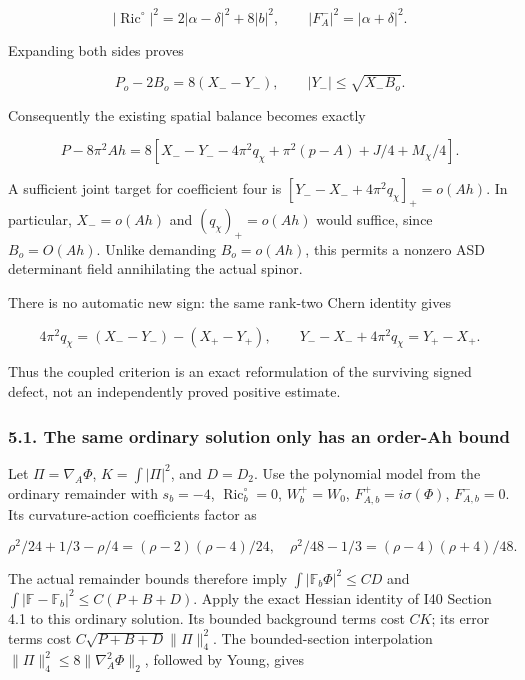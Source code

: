 \documentclass[
  11pt,
]{article}
\begin{document}
\[
 |\operatorname{Ric}^{\circ}|^2
 =2|\alpha-\delta|^2+8|b|^2,\qquad
 |F_A^-|^2=|\alpha+\delta|^2.
\]

Expanding both sides proves

\[
 \boxed{P_o-2B_o=8(X_--Y_-),\qquad
 |Y_-|\le\sqrt{X_-B_o}.}
 \tag{5.2}
\]

Consequently the existing spatial balance becomes exactly

\[
 P-8\pi^2Ah=8\left[X_--Y_--4\pi^2q_\chi+
             \pi^2(p-A)+J/4+M_\chi/4\right].
 \tag{5.3}
\]

A sufficient joint target for coefficient four is
\([Y_--X_-+4\pi^2q_\chi]_+=o(Ah)\). In particular, \(X_-=o(Ah)\) and
\((q_\chi)_+=o(Ah)\) would suffice, since \(B_o=O(Ah)\). Unlike
demanding \(B_o=o(Ah)\), this permits a nonzero ASD determinant field
annihilating the actual spinor.

There is no automatic new sign: the same rank-two Chern identity gives

\[
 4\pi^2q_\chi=(X_--Y_-)-(X_+-Y_+),\qquad
 Y_--X_-+4\pi^2q_\chi=Y_+-X_+.
 \tag{5.4}
\]

Thus the coupled criterion is an exact reformulation of the surviving
signed defect, not an independently proved positive estimate.

\hypertarget{the-same-ordinary-solution-only-has-an-order-ah-bound}{%
\subsubsection{5.1. The same ordinary solution only has an order-Ah
bound}\label{the-same-ordinary-solution-only-has-an-order-ah-bound}}

Let \(\Pi=\nabla_A\Phi\), \(K=\int|\Pi|^2\), and \(D=D_2\). Use the
polynomial model from the ordinary remainder with \(s_b=-4\),
\(\operatorname{Ric}_b^\circ=0\), \(W_b^+=W_0\),
\(F_{A,b}^+=i\sigma(\Phi)\), \(F_{A,b}^-=0\). Its curvature-action
coefficients factor as

\[
 \rho^2/24+1/3-\rho/4=(\rho-2)(\rho-4)/24,
 \quad \rho^2/48-1/3=(\rho-4)(\rho+4)/48.
\]

The actual remainder bounds therefore imply
\(\int|\mathbb F_b\Phi|^2\le CD\) and
\(\int|\mathbb F-\mathbb F_b|^2\le C(P+B+D)\). Apply the exact Hessian
identity of I40 Section 4.1 to this ordinary solution. Its bounded
background terms cost \(CK\); its error terms cost
\(C\sqrt{P+B+D}\|\Pi\|_4^2\). The bounded-section interpolation
\(\|\Pi\|_4^2\le8\|\nabla_A^2\Phi\|_2\), followed by Young, gives
\end{document}
